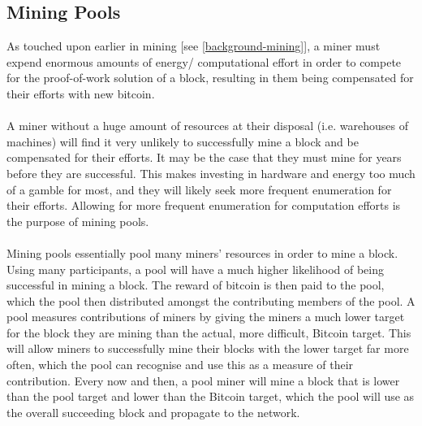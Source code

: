 \subsection{Mining Pools}
As touched upon earlier in mining [see \ref{background-mining}], a miner must expend enormous amounts of energy/ computational effort in order to compete for the proof-of-work solution of a block, resulting in them being compensated for their efforts with new bitcoin. 
\\\\
A miner without a huge amount of resources at their disposal (i.e. warehouses of machines) will find it very unlikely to successfully mine a block and be compensated for their efforts. It may be the case that they must mine for years before they are successful. This makes investing in hardware and energy too much of a gamble for most, and they will likely seek more frequent enumeration for their efforts. Allowing for more frequent enumeration for computation efforts is the purpose of mining pools.
\\\\
Mining pools essentially pool many miners' resources in order to mine a block. Using many participants, a pool will have a much higher likelihood of being successful in mining a block. The reward of bitcoin is then paid to the pool, which the pool then distributed amongst the contributing members of the pool. A pool measures contributions of miners by giving the miners a much lower target for the block they are mining than the actual, more difficult, Bitcoin target. This will allow miners to successfully mine their blocks with the lower target far more often, which the pool can recognise and use this as a measure of their contribution. Every now and then, a pool miner will mine a block that is lower than the pool target and lower than the Bitcoin target, which the pool will use as the overall succeeding block and propagate to the network.

